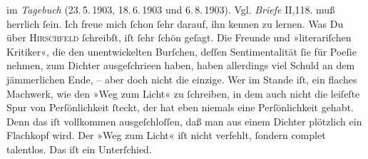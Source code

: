 \begin{ledgroupsized}[t]{13cm}
{{{                  im \emph{Tagebuch} (23. 5. 1903, 18. 6. 1903 und 6. 8. 1903). Vgl. \emph{Briefe} II,118. }}}\label{K_L03204-2h} muß herrlich ſein. Ich freue mich
               ſchon ſehr darauf, ihn kennen zu lernen. {\pb}Was Du
               über \textsc{Hirschfeld} ſchreibſt, iſt ſehr ſchön geſagt. Die Freunde und »literariſchen Kritiker«, die
               den unentwickelten Burſchen,
               deſſen Sentimentalität ſie für Poeſie nehmen, zum Dichter ausgeſchrieen haben, haben
               allerdings viel Schuld an dem jämmerlichen Ende, – aber doch nicht die einzige. Wer
               im Stande iſt, ein flaches Machwerk, wie den »Weg zum
                  Licht« zu ſchreiben, in dem auch nicht die leiſeſte Spur von Perſönlichkeit
               ſteckt, der hat eben niemals eine Perſönlichkeit gehabt. Denn das iſt vollkommen
               ausgeſchloſſen, daß man aus einem Dichter {\pb}plötzlich
               ein Flachkopf wird. Der »Weg zum Licht« iſt
               nicht verfehlt, ſondern complet talentlos. Das iſt ein Unterſchied.\pend
           \pstart

\end{ledgroupsized}
